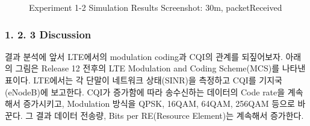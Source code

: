             \begin{figure}[h!]
            \centering
            \hspace{3mm}
            \hspace{3mm}
            \hspace{3mm}
            \hspace{3mm}
            \hspace{3mm}
            \caption{Experiment 1-2 Simulation Results Screenshot: 30m, packetReceived}
            \end{figure}
            
    \subsubsection*{1. 2. 3 Discussion}
    \vspace{-3mm}
        결과 분석에 앞서 LTE에서의 modulation coding과 CQI의 관계를 되짚어보자. 아래의 그림은 Release 12 전후의 LTE Modulation and Coding Scheme(MCS)를 나타낸 표이다. LTE에서는 각 단말이 네트워크 상태(SINR)을 측정하고  CQI를 기지국(eNodeB)에 보고한다. CQI가 증가함에 따라 송수신하는 데이터의 Code rate을 계속해서 증가시키고, Modulation 방식을 QPSK, 16QAM, 64QAM, 256QAM 등으로 바꾼다. 그 결과 데이터 전송량, Bits per RE(Resource Element)는 계속해서 증가한다.
        
